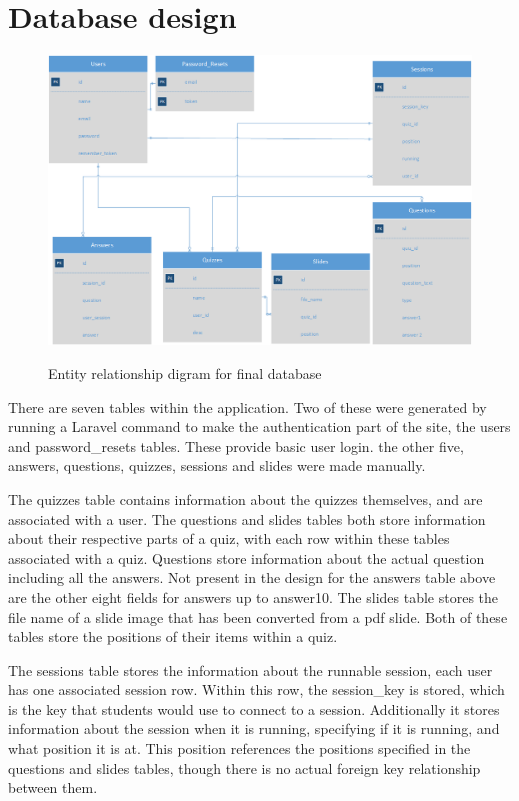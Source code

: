 \section{Database design}
\begin{figure}
	\caption{Entity relationship digram for final database}
	\includegraphics[width=\textwidth]{Chapter3/Final-ER-Image}
	\label{fig:er-diagram}
\end{figure}
\newpage

There are seven tables within the application. Two of these were generated by running a Laravel command to make the authentication part of the site, the users and password\_resets tables. These provide basic user login. the other five, answers, questions, quizzes, sessions and slides were made manually.

The quizzes table contains information about the quizzes themselves, and are associated with a user. The questions and slides tables both store information about their respective parts of a quiz, with each row within these tables associated with a quiz. Questions store information about the actual question including all the answers. Not present in the design  for the answers table above are the other eight fields for answers up to answer10. The slides table stores the file name of a slide image that has been converted from a pdf slide. Both of these tables store the positions of their items within a quiz.

The sessions table stores the information about the runnable session, each user has one associated session row. Within this row, the session\_key is stored, which is the key that students would use to connect to a session. Additionally it stores information about the session when it is running, specifying if it is running, and what position it is at. This position references the positions specified in the questions and slides tables, though there is no actual foreign key relationship between them. 

